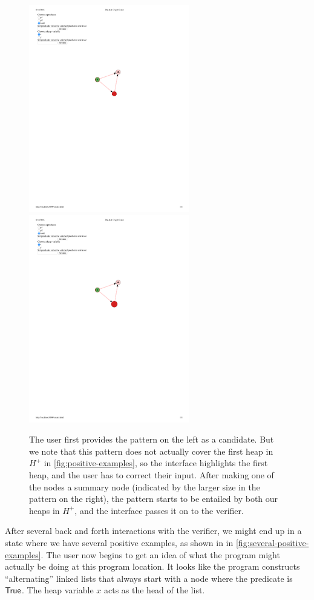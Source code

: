\begin{figure}
  \centering
  \includegraphics[width=7cm]{fig/candidate3.pdf}
  \includegraphics[width=7cm]{fig/candidate4.pdf}
  \caption{The user first provides the pattern on the left as a candidate. But we note that this pattern does not actually cover the first heap in $H^{+}$ in \autoref{fig:positive-examples}, so the interface highlights the first heap, and the user has to correct their input. After making one of the nodes a summary node (indicated by the larger size in the pattern on the right), the pattern starts to be entailed by both our heaps in $H^{+}$, and the interface passes it on to the verifier.}
  \label{fig:pattern-attempts}
\end{figure}

After several back and forth interactions with the verifier, we might end up in a state where we have several positive examples, as shown in in \autoref{fig:several-positive-examples}. The user now begins to get an idea of what the program might actually be doing at this program location. It looks like the program constructs ``alternating'' linked lists that always start with a node where the predicate is $\mathsf{True}$. The heap variable $x$ acts as the head of the list.

